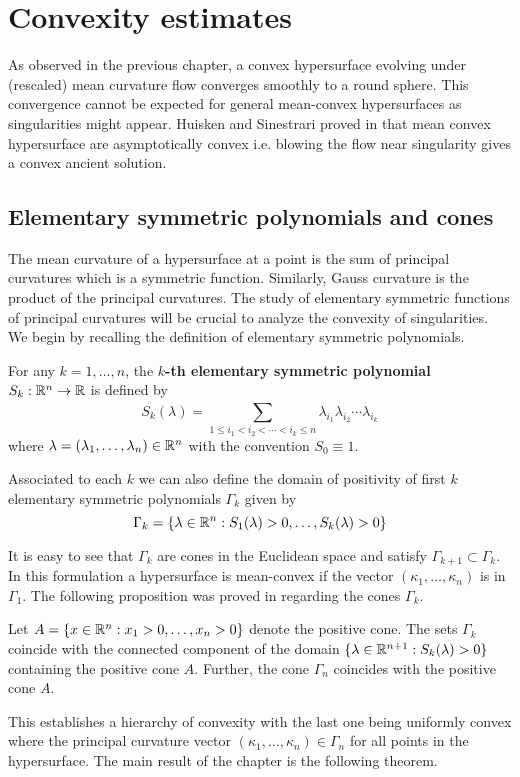 \chapter{Convexity estimates}

As observed in the previous chapter, a convex hypersurface evolving under (rescaled) mean curvature flow converges smoothly to a round sphere. This convergence cannot be expected for general mean-convex hypersurfaces as singularities might appear. Huisken and Sinestrari proved in \cite{huisken1999convexity, huisken1999mean} that mean convex hypersurface are asymptotically convex i.e. blowing the flow near singularity gives a convex ancient solution.



\section{Elementary symmetric polynomials and cones}

The mean curvature of a hypersurface at a point is the sum of principal curvatures which is a symmetric function. Similarly, Gauss curvature is the product of the principal curvatures. The study of elementary symmetric functions of principal curvatures will be crucial to analyze the convexity of singularities. We begin by recalling the definition of elementary symmetric polynomials.

\begin{defn}
    For any $ k=1, \ldots, n $, the \textbf{$ k $-th elementary symmetric polynomial}   $ S_{k} :\mathbb{R}^{n} \to \mathbb{R} $  is defined by
    \[ S_{k}(\lambda) = \sum_{1\le i_{1}< i_{2}< \cdots < i_{k}\le n}^{}\lambda_{i_{1}}\lambda_{i_{2}} \cdots \lambda_{i_{k}} \]
    where $ \lambda = (\lambda_{1}, \ldots, \lambda_{n}) \in \mathbb{R}^{n}$ with the convention $ S_{0} \equiv 1$. 
\end{defn}

Associated to each $ k $ we can also define the domain of positivity of first $ k $ elementary symmetric polynomials $ \Gamma_{k} $ given by 
\[ \Gamma_{k} = \{\lambda \in \mathbb{R}^{n} : S_{1}(\lambda) >0, \ldots , S_{k}(\lambda) >0\} \]

It is easy to see that $ \Gamma_{k} $ are cones in the Euclidean space and satisfy $ \Gamma_{k+1} \subset \Gamma_{k} $. In this formulation a hypersurface is mean-convex if the vector $ (\kappa_{1}, \ldots, \kappa_{n}) $ is in $ \Gamma_{1} $. The following proposition was proved in \cite{huisken1999convexity} regarding the cones $ \Gamma_{k} $. 
\begin{proposition}
    Let $ A = \{x \in \mathbb{R}^{n} : x_{1}>0, \ldots, x_{n}>0 \} $ denote the positive cone. The sets $ \Gamma_{k} $ coincide with the connected component of the domain $ \{\lambda \in \mathbb{R}^{n+1} : S_{k}(\lambda)>0\} $ containing the positive cone $ A $. Further, the cone $ \Gamma_{n} $ coincides with the positive cone $ A $.
\end{proposition}
This establishes a hierarchy of convexity with the last one being uniformly convex where the principal curvature vector $ (\kappa_{1}, \ldots, \kappa_{n}) \in \Gamma_{n} $ for all points in the hypersurface. The main result of the chapter is the following theorem. 

